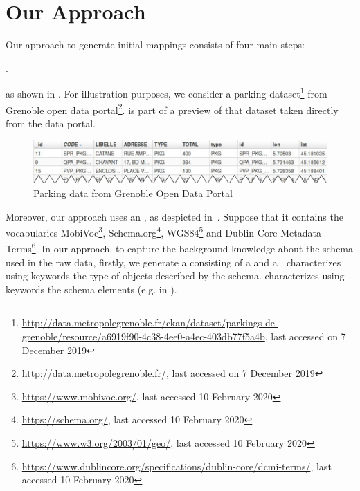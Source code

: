 \section{Our Approach}\label{sec:approach}
Our approach to generate initial mappings consists of four main steps:\begin{enumerate*}[label={\roman*)},font={\color{red!50!black}\bfseries}]
\item {}
\item {}
\item {}
\item {}.
\end{enumerate*}
 as shown in . For illustration purposes, we consider a parking dataset\footnote{\url{http://data.metropolegrenoble.fr/ckan/dataset/parkings-de-grenoble/resource/a6919f90-4c38-4ee0-a4ec-403db77f5a4b}, last accessed on 7 December 2019} from Grenoble open data portal\footnote{\url{http://data.metropolegrenoble.fr/}, last accessed on 7 December 2019}.  is part of a preview of that dataset taken directly from the data portal.

\begin{figure}[h]
	\centering
	\includegraphics[scale=0.45]{images/sampleRawData.pdf}
	\caption{Parking data from Grenoble Open Data Portal}
	\label{fig:sampleRawData}
\end{figure}

Moreover, our approach uses an , as despicted in~. Suppose that it contains the vocabularies MobiVoc\footnote{\url{https://www.mobivoc.org/}, last accessed 10 February 2020}, Schema.org\footnote{\url{https://schema.org/}, last accessed 10 February 2020}, WGS84\footnote{\url{https://www.w3.org/2003/01/geo/}, last accessed 10 February 2020} and Dublin Core Metadata Terms\footnote{\url{https://www.dublincore.org/specifications/dublin-core/dcmi-terms/}, last accessed 10 February 2020}. In our approach, to capture the background knowledge about the schema used in the raw data, firstly, we generate a  consisting of a  and a .  characterizes using keywords the type of objects described by the schema.  characterizes using keywords the schema elements (e.g.  in ).

